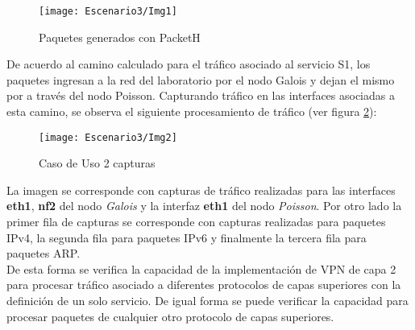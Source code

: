 \begin{figure}[h!] 
\centering    
\texttt{[image: Escenario3/Img1]}
\caption[Paquetes generados con PacketH]{Paquetes generados con PacketH}
\label{fig:PaquetsSend}
\end{figure}

De acuerdo al camino calculado para el tr\'afico asociado al servicio S1, los paquetes ingresan a la red del laboratorio por el nodo Galois y dejan el mismo por a través del nodo Poisson. Capturando tr\'afico en las interfaces asociadas a esta camino, se observa el siguiente procesamiento de tr\'afico (ver figura \ref{fig:CapturaTCP}):

\begin{figure}[h!] 
\centering    
\texttt{[image: Escenario3/Img2]}
\caption[Caso de Uso 2 capturas]{Caso de Uso 2 capturas}
\label{fig:CapturaTCP}
\end{figure}

La imagen se corresponde con capturas de tr\'afico realizadas para las interfaces \textbf{eth1}, \textbf{nf2} del nodo \textit{Galois} y la interfaz \textbf{eth1} del nodo \textit{Poisson}. Por otro lado la primer fila de capturas se corresponde con capturas realizadas para paquetes IPv4, la segunda fila para paquetes IPv6 y finalmente la tercera fila para paquetes ARP.\\

De esta forma se verifica la capacidad de la implementaci\'on de VPN de capa 2 para procesar tr\'afico asociado a diferentes protocolos de capas superiores con la definici\'on de un solo servicio. De igual forma se puede verificar la capacidad para procesar paquetes de cualquier otro protocolo de capas superiores.\\ 